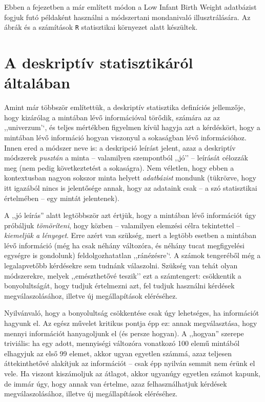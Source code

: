 \documentclass[]{book}
\begin{document}
Ebben a fejezetben a már említett módon a Low Infant Birth Weight adatbázist fogjuk futó példaként használni a módszertani mondanivaló illusztrálására. Az ábrák és a számítások \texttt{R} statisztikai környezet alatt készültek.

\hypertarget{deskriptivaltalaban}{%
\section{A deskriptív statisztikáról általában}\label{deskriptivaltalaban}}

Amint már többször említettük, a deskriptív statisztika definíciós jellemzője, hogy kizárólag a mintában lévő információval törődik, számára az az ,,univerzum'`, és teljes mértékben figyelmen kívül hagyja azt a kérdéskört, hogy a mintában lévő információ hogyan viszonyul a sokaságban lévő információhoz. Innen ered a módszer neve is: a deskripció leírást jelent, azaz a deskriptív módszerek \emph{pusztán} a minta -- valamilyen szempontból ,,jó'' -- leírását célozzák meg (nem pedig következtetést a sokaságra). Nem véletlen, hogy ebben a kontextusban nagyon sokszor minta helyett \emph{adatbázist} mondunk (tükrözve, hogy itt igazából nincs is jelentősége annak, hogy az adataink csak -- a szó statisztikai értelmében -- egy mintát jelentenek).

A ,,jó leírás'' alatt legtöbbször azt értjük, hogy a mintában lévő információt úgy próbáljuk \emph{tömöríteni}, hogy közben -- valamilyen elemzési célra tekintettel -- \emph{kiemeljük a lényeget}. Erre azért van szükség, mert a legtöbb esetben a mintában lévő információ (még ha csak néhány változóra, és néhány tucat megfigyelési egységre is gondolunk) feldolgozhatatlan ,,ránézésre'`. A számok tengeréből még a legalapvetőbb kérdésekre sem tudnánk válaszolni. Szükség van tehát olyan módszerekre, melyek ,,emészthetővé teszik'' ezt a számtengert: csökkentik a bonyolultságát, hogy tudjuk értelmezni azt, fel tudjuk használni kérdések megválaszolásához, illetve új megállapítások eléréséhez.

Nyilvánvaló, hogy a bonyolultság csökkentése csak úgy lehetséges, ha információt hagyunk el. Az egész művelet kritikus pontja épp ez: annak megválasztása, hogy mennyi információt hanyagoljunk el (és persze hogyan). A ,,hogyan'' szerepe triviális: ha egy adott, mennyiségi változóra vonatkozó 100 elemű mintából elhagyjuk az első 99 elemet, akkor ugyan egyetlen számmá, azaz teljesen áttekinthetővé alakítjuk az információt -- csak épp nyilván semmit nem érünk el vele. Ha viszont kiszámoljuk az átlagot, akkor ugyanúgy egyetlen számot kapunk, de immár úgy, hogy annak van értelme, azaz felhasználhatjuk kérdések megválaszolásához, illetve új megállapítások eléréséhez.
\end{document}
